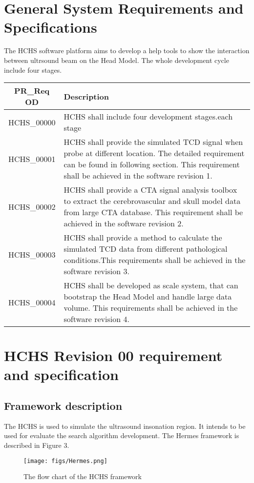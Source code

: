 \documentclass[10pt]{article}
\begin{document}
\section{General System Requirements and Specifications}
The HCHS software platform aims to develop a help tools to show the interaction between ultrsound beam on the Head Model. The whole development cycle include four stages.

\begin{tabularx}{\textwidth}{|c|X|}
  \hline
  \textbf{PR\_Req OD} & \textbf{Description}\\ \hline
  
  HCHS\_00000 & HCHS shall include four development stages.each stage \\ \hline
  HCHS\_00001 & HCHS shall provide the simulated TCD signal when probe at different location. The detailed requirement can be found in following section. This requirement shall be achieved in the software revision 1.\\ \hline
  HCHS\_00002 & HCHS shall provide a CTA signal analysis toolbox to extract the cerebrovascular and skull model data from large CTA database. This requirement shall be achieved in the software revision 2. \\ \hline
  HCHS\_00003 & HCHS shall provide a method to calculate the simulated TCD data from different pathological conditions.This requirements shall be achieved in the software revision 3.\\ \hline
  HCHS\_00004 & HCHS shall be developed as scale system, that can bootstrap the Head Model and handle large data volume. This requirements shall be achieved in the software revision 4. \\ \hline
 \end{tabularx} \par
 
\section{HCHS Revision 00 requirement and specification}
  \subsection{Framework description}
  The HCHS is used to simulate the ultrasound insonation region. It intends to be used for evaluate the search algorithm development. The Hermes framework is described in Figure 3.
    \begin{figure}
    \centering
    \texttt{[image: figs/Hermes.png]}
    \caption{The flow chart of the HCHS framework}
    \end{figure}
\end{document}
